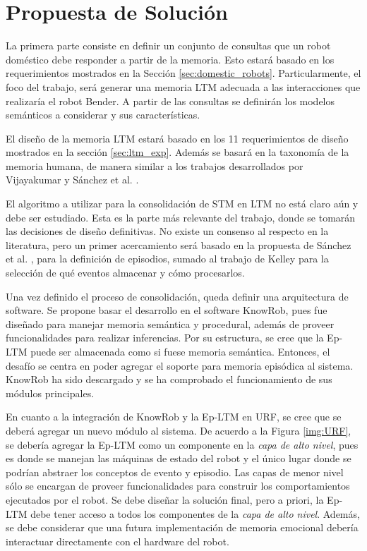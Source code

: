 \section{Propuesta de Solución}

%

La primera parte consiste en definir un conjunto de consultas que un robot doméstico debe responder a partir de la memoria. Esto estará basado en los requerimientos mostrados en la Sección \ref{sec:domestic_robots}. Particularmente, el foco del trabajo, será generar una memoria LTM adecuada a las interacciones que realizaría el robot Bender. A partir de las consultas se definirán los modelos semánticos a considerar y sus características. 

El diseño de la memoria LTM estará basado en los 11 requerimientos de diseño mostrados en la sección \ref{sec:ltm_exp}. Además se basará en la taxonomía de la memoria humana, de manera similar a los trabajos desarrollados por Vijayakumar  \cite{Vijayakumar2014} y Sánchez et al. \cite{Sanchez:2015}.

El algoritmo a utilizar para la consolidación de STM en LTM no está claro aún y debe ser estudiado. Esta es la parte más relevante del trabajo, donde se tomarán las decisiones de diseño definitivas. No existe un consenso al respecto en la literatura, pero un primer acercamiento será basado en la propuesta de Sánchez et al.  \cite{Sanchez:2015}, para la definición de episodios, sumado al trabajo de Kelley  \cite{Kelley2014} para la selección de qué eventos almacenar y cómo procesarlos.

Una vez definido el proceso de consolidación, queda definir una arquitectura de software. Se propone basar el desarrollo en el software KnowRob, pues fue diseñado para manejar memoria semántica y procedural, además de proveer funcionalidades para realizar inferencias. Por su estructura, se cree que la Ep-LTM puede ser almacenada como si fuese memoria semántica. Entonces, el desafío se centra en poder agregar el soporte para memoria episódica al sistema. KnowRob ha sido descargado y se ha comprobado el funcionamiento de sus módulos principales.

En cuanto a la integración de KnowRob y la Ep-LTM en URF, se cree que se deberá agregar un nuevo módulo al sistema. De acuerdo a la Figura \ref{img:URF}, se debería agregar la Ep-LTM como un componente en la \textit{capa de alto nivel}, pues es donde se manejan las máquinas de estado del robot y el único lugar donde se podrían abstraer los conceptos de evento y episodio. Las capas de menor nivel sólo se encargan de proveer funcionalidades para construir los comportamientos ejecutados por el robot. Se debe diseñar la solución final, pero a priori, la Ep-LTM debe tener acceso a todos los componentes de la \textit{capa de alto nivel}. Además, se debe considerar que una futura implementación de memoria emocional debería interactuar directamente con el hardware del robot. 


